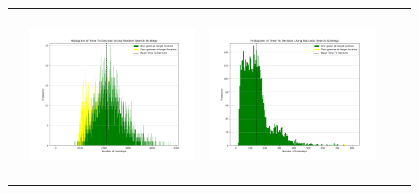 \begin{landscape}
\begin{table}[h!]
\begin{tabular}{ | c | c | c | c | c |}
\begin{minipage}[c][45mm][c]{45mm}
    \end{minipage}
    &
    \begin{minipage}[c][45mm][c]{45mm}
      \includegraphics[width=44mm, height=44mm]{Chapters/MultiAgentTargetDetection/Figs/Histograms/MiscalibratedSensor/4-4/4-4RandomHistogram.png}
    \end{minipage}
    &
    \begin{minipage}[c][45mm][c]{45mm}
      \includegraphics[width=44mm, height=44mm]{Chapters/MultiAgentTargetDetection/Figs/Histograms/MiscalibratedSensor/4-4/4-4SaccadicHistogram.png}
    \end{minipage}
    \\


\end{tabular}
\end{table}
\end{landscape}
